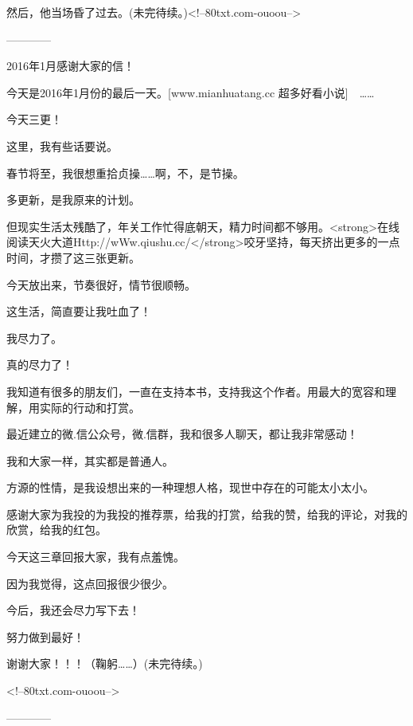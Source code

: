 \begin{this_body}
然后，他当场昏了过去。(未完待续。)<!--80txt.com-ouoou-->

------------

2016年1月感谢大家的信！

今天是2016年1月份的最后一天。[www.mianhuatang.cc 超多好看小说]　……

今天三更！

这里，我有些话要说。

春节将至，我很想重拾贞操……啊，不，是节操。

多更新，是我原来的计划。

但现实生活太残酷了，年关工作忙得底朝天，精力时间都不够用。<strong>在线阅读天火大道Http://wWw.qiushu.cc/</strong>咬牙坚持，每天挤出更多的一点时间，才攒了这三张更新。

今天放出来，节奏很好，情节很顺畅。

这生活，简直要让我吐血了！

我尽力了。

真的尽力了！

我知道有很多的朋友们，一直在支持本书，支持我这个作者。用最大的宽容和理解，用实际的行动和打赏。

最近建立的微.信公众号，微.信群，我和很多人聊天，都让我非常感动！

我和大家一样，其实都是普通人。

方源的性情，是我设想出来的一种理想人格，现世中存在的可能太小太小。

感谢大家为我投的为我投的推荐票，给我的打赏，给我的赞，给我的评论，对我的欣赏，给我的红包。

今天这三章回报大家，我有点羞愧。

因为我觉得，这点回报很少很少。

今后，我还会尽力写下去！

努力做到最好！

谢谢大家！！！（鞠躬……）(未完待续。)

<!--80txt.com-ouoou-->

------------

\end{this_body}

